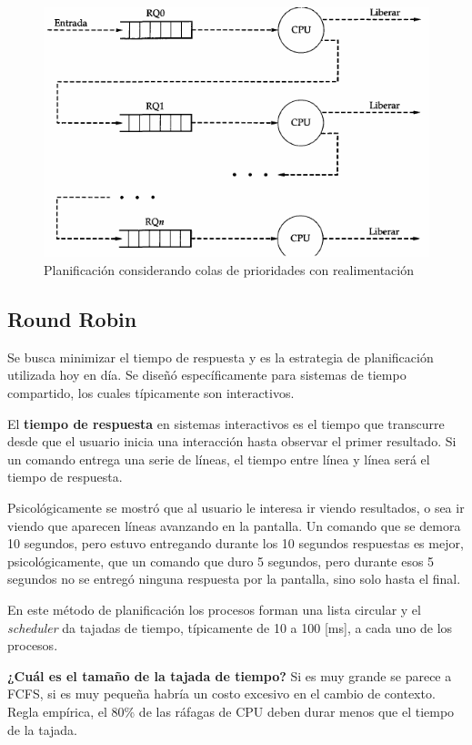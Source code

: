 \begin{figure}[htbp]
\centering
\includegraphics[scale=.9]{img/C06_cpu/realimentacion.png}
\caption{Planificación considerando colas de prioridades con realimentación}
\label{fig:planificacion_realimentacion}
\end{figure}

\subsection{Round Robin}
Se busca minimizar el tiempo de respuesta y es la estrategia de planificación
utilizada hoy en día. Se diseñó específicamente para sistemas de tiempo
compartido, los cuales típicamente son interactivos.

El \textbf{tiempo de respuesta} en sistemas interactivos es el tiempo que
transcurre desde que el usuario inicia una interacción hasta observar el primer
resultado. Si un comando entrega una serie de líneas, el tiempo entre línea y
línea será el tiempo de respuesta.

Psicológicamente se mostró que al usuario le interesa ir viendo resultados, o
sea ir viendo que aparecen líneas avanzando en la pantalla. Un comando que se
demora 10 segundos, pero estuvo entregando durante los 10 segundos respuestas es
mejor, psicológicamente, que un comando que duro 5 segundos, pero durante esos 5
segundos no se entregó ninguna respuesta por la pantalla, sino solo hasta el
final.

En este método de planificación los procesos forman una lista circular y el
\textit{scheduler} da tajadas de tiempo, típicamente de 10 a 100 [ms], a cada
uno de los procesos.

\textbf{¿Cuál es el tamaño de la tajada de tiempo?} Si es muy grande se
parece a FCFS, si es muy pequeña habría un costo excesivo en el cambio de
contexto. Regla empírica, el 80\% de las ráfagas de CPU deben durar menos que el
tiempo de la tajada.

